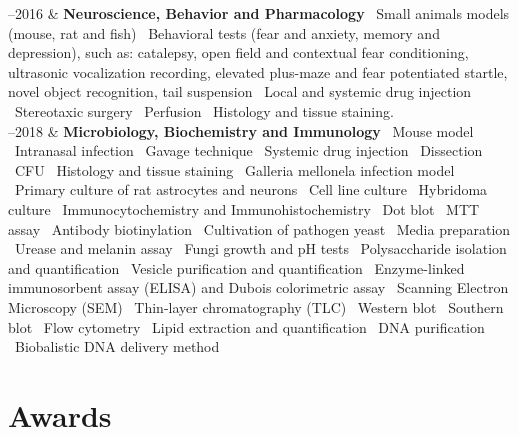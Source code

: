 \documentclass[11pt, a4paper]{article}
\newcommand{\Duration}[2]{\fontsize{10pt}{0}\selectfont #1--#2}
\begin{document}
\begin{EntriesTable}
	
	\Duration{2010}{2016}  &
	\textbf{Neuroscience, Behavior and Pharmacology}
	\newline
	 \textbullet \ Small animals models (mouse, rat and fish) \textbullet \ Behavioral tests (fear and anxiety, memory and depression), such as: catalepsy, open field and contextual fear conditioning, ultrasonic vocalization recording, elevated plus-maze and fear potentiated startle, novel object recognition, tail suspension \textbullet \ Local and systemic drug injection \textbullet \ Stereotaxic surgery \textbullet \ Perfusion \textbullet \ Histology and tissue staining.
	\\
	
	\Duration{2014}{2018}  &
	\textbf{Microbiology, Biochemistry and Immunology}
	\newline
	\textbullet \ Mouse model \textbullet \ Intranasal infection \textbullet \ Gavage technique \textbullet \ Systemic drug injection \textbullet \ Dissection \textbullet \ CFU \textbullet \ Histology and tissue staining \textbullet \ Galleria mellonela infection model \textbullet \ Primary culture of rat astrocytes and neurons \textbullet \ Cell line culture \textbullet \ Hybridoma culture \textbullet \ Immunocytochemistry and Immunohistochemistry \textbullet \ Dot blot \textbullet \ MTT assay \textbullet \ Antibody biotinylation \textbullet \ Cultivation of pathogen yeast \textbullet \ Media preparation \textbullet \ Urease and melanin assay \textbullet \ Fungi growth and pH tests \textbullet \ Polysaccharide isolation and quantification \textbullet \ Vesicle purification and quantification \textbullet \ Enzyme-linked immunosorbent assay (ELISA) and Dubois colorimetric assay  \textbullet \ Scanning Electron Microscopy (SEM)  \textbullet \ Thin-layer chromatography (TLC) \textbullet \ Western blot \textbullet \ Southern blot \textbullet \ Flow cytometry \textbullet \ Lipid extraction and quantification \textbullet \ DNA purification  \textbullet \ Biobalistic DNA delivery method 
	\\

	
\end{EntriesTable}


\section*{Awards}
\end{document}
